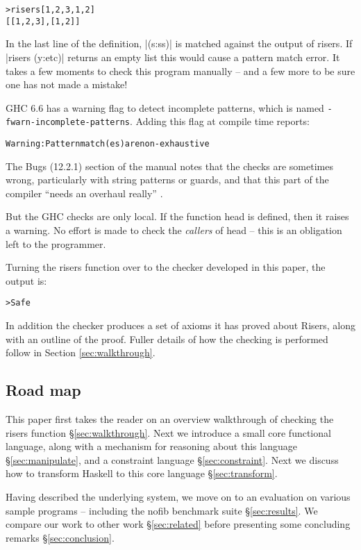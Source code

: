 \documentclass[preprint]{sigplanconf}
\newcommand{\T}[1]{\texttt{#1}}
\newcommand{\C}[1]{\textsf{#1}}
\newenvironment{code}{\begin{alltt}\small}{\end{alltt}}
\begin{document}
\begin{code}
> risers [1,2,3,1,2]
[[1,2,3],[1,2]]
\end{code}

In the last line of the definition, |(s:ss)| is matched against the output of \C{risers}. If |risers (y:etc)| returns an empty list this would cause a pattern match error. It takes a few moments to check this program manually -- and a few more to be sure one has not made a mistake!

GHC \citep{ghc_manual} 6.6 has a warning flag to detect incomplete patterns, which is named \T{-fwarn-incomplete-patterns}. Adding this flag at compile time reports:

\begin{code}
Warning: Pattern match(es) are non-exhaustive
\end{code}

The Bugs (12.2.1) section of the manual notes that the checks are sometimes wrong, particularly with string patterns or guards, and that this part of the compiler ``needs an overhaul really'' \citep{ghc_manual}.

But the GHC checks are only local. If the function \C{head} is defined, then it raises a warning. No effort is made to check the \textit{callers} of \C{head} -- this is an obligation left to the programmer.

Turning the \C{risers} function over to the checker developed in this paper, the output is:

\begin{code}
> Safe
\end{code}

In addition the checker produces a set of axioms it has proved about Risers, along with an outline of the proof. Fuller details of how the checking is performed follow in Section \ref{sec:walkthrough}.

\subsection{Road map}

This paper first takes the reader on an overview walkthrough of checking the \C{risers} function \S\ref{sec:walkthrough}. Next we introduce a small core functional language, along with a mechanism for reasoning about this language \S\ref{sec:manipulate}, and a constraint language \S\ref{sec:constraint}. Next we discuss how to transform Haskell to this core language \S\ref{sec:transform}.

Having described the underlying system, we move on to an evaluation on various sample programs -- including the \textsf{nofib} benchmark suite \S\ref{sec:results}. We compare our work to other work \S\ref{sec:related} before presenting some concluding remarks \S\ref{sec:conclusion}.
\end{document}
